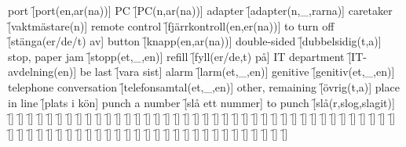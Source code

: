 \begin{questions}
\begin{multicols}{2}
        \question port \f[port(en,ar(na))]
        \question PC \f[PC(n,ar(na))]
        \question adapter \f[adapter(n,\_,rarna)]
        \question caretaker \f[vaktmästare(n)]
        \question remote control \f[fjärrkontroll(en,er(na))]
        \question to turn off \f[stänga(er/de/t) av]
        \question button \f[knapp(en,ar(na))]
        \question double-sided \f[dubbelsidig(t,a)]
        \question stop, paper jam \f[stopp(et,\_,en)]
        \question refill \f[fyll(er/de,t) på]
        \question IT department \f[IT-avdelning(en)]
        \question be last \f[vara sist]
        \question alarm \f[larm(et,\_,en)]
        \question genitive \f[genitiv(et,\_,en)]
        \question telephone conversation \f[telefonsamtal(et,\_,en)]
        \question other, remaining \f[övrig(t,a)]
        \question place in line \f[plats i kön]
        \question punch a number \f[slå ett nummer]
        \question to punch \f[slå(r,slog,slagit)]
        \question  \f[]
        \question  \f[]
        \question  \f[]
        \question  \f[]
        \question  \f[]
        \question  \f[]
        \question  \f[]
        \question  \f[]
        \question  \f[]
        \question  \f[]
        \question  \f[]
        \question  \f[]
        \question  \f[]
        \question  \f[]
        \question  \f[]
        \question  \f[]
        \question  \f[]
        \question  \f[]
        \question  \f[]
        \question  \f[]
        \question  \f[]
        \question  \f[]
        \question  \f[]
        \question  \f[]
        \question  \f[]
        \question  \f[]
        \question  \f[]
        \question  \f[]
        \question  \f[]
        \question  \f[]
        \question  \f[]
        \question  \f[]
        \question  \f[]
        \question  \f[]
        \question  \f[]
        \question  \f[]
        \question  \f[]
        \question  \f[]
        \question  \f[]
        \question  \f[]
        \question  \f[]
        \question  \f[]
        \question  \f[]
        \question  \f[]
        \question  \f[]
        \question  \f[]
        \question  \f[]
        \question  \f[]
        \question  \f[]
        \question  \f[]
        \question  \f[]
        \question  \f[]
        \question  \f[]
        \question  \f[]
        \question  \f[]
        \question  \f[]
        \question  \f[]
        \question  \f[]
        \question  \f[]
        \question  \f[]
        \question  \f[]
        \question  \f[]
        \question  \f[]
        \question  \f[]
        \question  \f[]
        \question  \f[]
        \question  \f[]
        \question  \f[]
        \question  \f[]

\end{multicols}
\end{questions}
